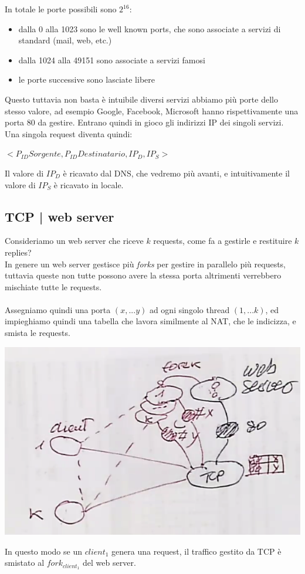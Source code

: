 \documentclass[11pt, oneside]{article}   	%
\begin{document}
In totale le porte possibili sono $2^{16}$:
\begin{itemize}
\item dalla 0 alla 1023 sono le well known ports, che sono associate a servizi di standard (mail, web, etc.)
\item dalla 1024 alla 49151 sono associate a servizi famosi
\item le porte successive sono lasciate libere
\end{itemize}
Questo tuttavia non basta è intuibile diversi servizi abbiamo più porte dello stesso valore, ad esempio Google, Facebook, Microsoft hanno rispettivamente una porta $80$ da gestire. Entrano quindi in gioco gli indirizzi IP dei singoli servizi. Una singola request diventa quindi:
\begin{center}
$<P_{ID}Sorgente,P_{ID}Destinatario, IP_D, IP_S>$
\end{center}
Il valore di $IP_D$ è ricavato dal DNS, che vedremo più avanti, e intuitivamente il valore di $IP_S$ è ricavato in locale.
\subsection*{TCP | web server}
Consideriamo un web server che riceve $k$ requests, come fa a gestirle e restituire $k$ replies? \\In genere un web server gestisce più \emph{forks} per gestire in parallelo più requests, tuttavia queste non tutte possono avere la stessa porta altrimenti verrebbero mischiate tutte le requests. \\\\Assegniamo quindi una porta $(x, ... y)$ ad ogni singolo thread $(1, ... k)$, ed impieghiamo quindi una tabella che lavora similmente al NAT, che le indicizza, e smista le requests.
\begin{center}
\includegraphics[scale=0.5]{t2}
\end{center}
In questo modo se un $client_1$ genera una request, il traffico gestito da TCP è smistato al $fork_{client_1}$ del web server.
\end{document}
